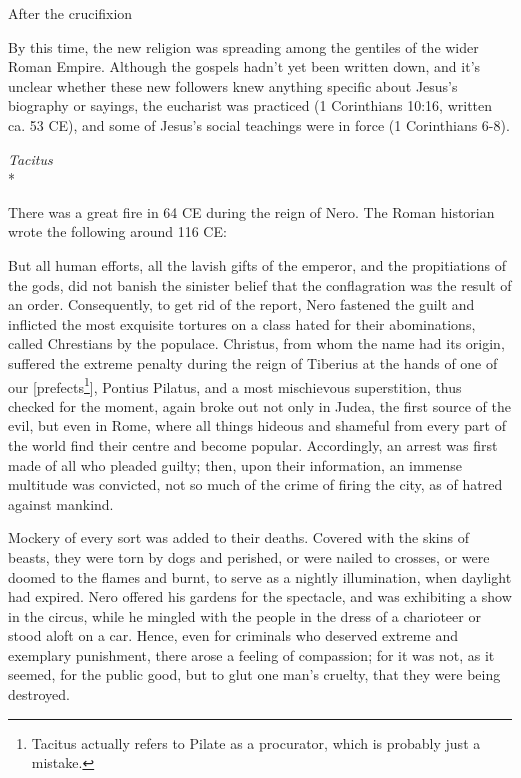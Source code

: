 \documentclass[10pt,twoside]{article} %
\newcommand{\doimage}[2]{\texttt{[image: \#2]}\label{fig:#2}}
\newcommand{\figbasic}[4]{ %
    \ifthenelse{\isodd{\pageref{fig:#2}}}{}{\hfill}
    \ifstrempty{#3}{
      \doimage{#1}{#2}
    }{
      \makebox{\doimage{#1}{#2} \\ #3}
    }
    \ifthenelse{\isodd{\pageref{fig:#2}}}{\hfill}{}
    \par
}
\newcommand{\fig}[2][0.4]{
  \figbasic{#1}{#2}{}{}
}
\newcommand{\quotesize}{\normalsize{}}
\newcommand{\comm}[1]{\begingroup \color{black!50} #1\endgroup}
\newenvironment{quotetext}{\begingroup\quotesize}{\endgroup}
\newcommand{\intex}[1]{\index[texts]{#1}}
\newcommand{\reftex}[1]{#1\intex{#1}}
\newcommand{\subhead}[1]{\emph{#1}\\*}
\begin{document}
\begin{section}{After the crucifixion}
\fig[0.6]{nero}

\comm{By this time, the new religion was  spreading among the gentiles of the wider Roman Empire.
Although the gospels hadn't yet been written down, and it's unclear whether
these new followers knew anything specific about Jesus's biography or sayings,
the eucharist was practiced (\reftex{1 Corinthians 10:16}, written ca. 53 CE),
and some of Jesus's social teachings were in force (\reftex{1 Corinthians 6-8}).
}


\subhead{Tacitus}\label{tacitus}%

\comm{There was a great fire in 64 CE during the reign of Nero. The Roman historian wrote the following around 116 CE:}

\begin{quotetext}
But all human efforts, all the lavish gifts of the emperor, and the
propitiations of the gods, did not banish the sinister belief that the
conflagration was the result of an order. Consequently, to get rid of
the report, Nero fastened the guilt and inflicted the most exquisite
tortures on a class hated for their abominations, called Chrestians by
the populace. Christus, from whom the name had its origin, suffered
the extreme penalty during the reign of Tiberius at the hands of one
of our [prefects\footnote{Tacitus actually refers to Pilate as a procurator, which is probably just a mistake.}], Pontius Pilatus, and a most mischievous
superstition, thus checked for the moment, again broke out not only in
Judea, the first source of the evil, but even in Rome, where all
things hideous and shameful from every part of the world find their
centre and become popular. Accordingly, an arrest was first made of
all who pleaded guilty; then, upon their information, an immense
multitude was convicted, not so much of the crime of firing the city,
as of hatred against mankind.
\end{quotetext}

\begin{quotetext}
Mockery of every sort was added to their deaths. Covered with the
skins of beasts, they were torn by dogs and perished, or were nailed
to crosses, or were doomed to the flames and burnt, to serve as a
nightly illumination, when daylight had expired. Nero offered his
gardens for the spectacle, and was exhibiting a show in the circus,
while he mingled with the people in the dress of a charioteer or stood
aloft on a car. Hence, even for criminals who deserved extreme and
exemplary punishment, there arose a feeling of compassion; for it was
not, as it seemed, for the public good, but to glut one man's cruelty,
that they were being destroyed.
\end{quotetext}


\end{section}
\end{document}
